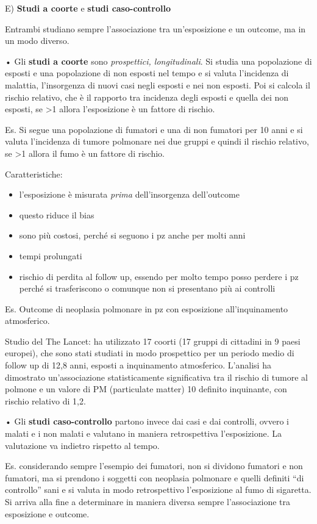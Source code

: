 E) \textbf{Studi a coorte} e \textbf{studi caso-controllo}

Entrambi studiano sempre l'associazione tra un'esposizione e un outcome,
ma in un modo diverso.

• Gli \textbf{studi a coorte} sono \emph{prospettici, longitudinali}. Si
studia una popolazione di esposti e una popolazione di non esposti nel
tempo e si valuta l'incidenza di malattia, l'insorgenza di nuovi casi
negli esposti e nei non esposti. Poi si calcola il rischio relativo, che
è il rapporto tra incidenza degli esposti e quella dei non esposti, se
\textgreater{}1 allora l'esposizione è un fattore di rischio.

Es. Si segue una popolazione di fumatori e una di non fumatori per 10
anni e si valuta l'incidenza di tumore polmonare nei due gruppi e quindi
il rischio relativo, se \textgreater{}1 allora il fumo è un fattore di
rischio.

Caratteristiche:

\begin{itemize}
\item
  l'esposizione è misurata \emph{prima} dell'insorgenza dell'outcome
\item
  questo riduce il bias
\item
  sono più costosi, perché si seguono i pz anche per molti anni
\item
  tempi prolungati
\item
  rischio di perdita al follow up, essendo per molto tempo posso perdere
  i pz perché si trasferiscono o comunque non si presentano più ai
  controlli
\end{itemize}

Es. Outcome di neoplasia polmonare in pz con esposizione
all'inquinamento atmosferico.

Studio del The Lancet: ha utilizzato 17 coorti (17 gruppi di cittadini
in 9 paesi europei), che sono stati studiati in modo prospettico per un
periodo medio di follow up di 12,8 anni, esposti a inquinamento
atmosferico. L'analisi ha dimostrato un'associazione statisticamente
significativa tra il rischio di tumore al polmone e un valore di PM
(particulate matter) 10 definito inquinante, con rischio relativo di
1,2.

• Gli \textbf{studi caso-controllo} partono invece dai casi e dai
controlli, ovvero i malati e i non malati e valutano in maniera
retrospettiva l'esposizione. La valutazione va indietro rispetto al
tempo.

Es. considerando sempre l'esempio dei fumatori, non si dividono fumatori
e non fumatori, ma si prendono i soggetti con neoplasia polmonare e
quelli definiti ``di controllo'' sani e si valuta in modo retrospettivo
l'esposizione al fumo di sigaretta. Si arriva alla fine a determinare in
maniera diversa sempre l'associazione tra esposizione e outcome.

